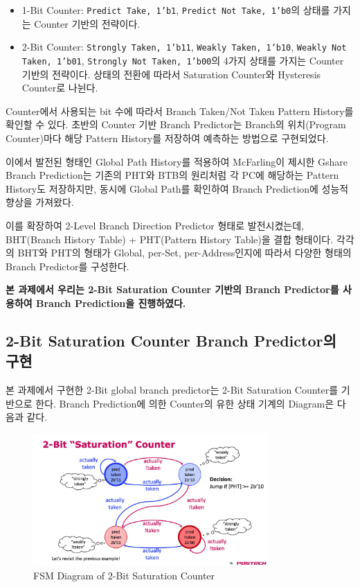 \documentclass[openright, a4paper]{article}
\newcommand{\code}[1]{\texttt{#1}}
\begin{document}
\begin{itemize}
    \item 1-Bit Counter: \code{Predict Take, 1'b1}, \code{Predict Not Take, 1'b0}의 상태를 가지는 Counter 기반의 전략이다.
    \item 2-Bit Counter: \code{Strongly Taken, 1'b11}, \code{Weakly Taken, 1'b10}, \code{Weakly Not Taken, 1'b01}, \code{Strongly Not Taken, 1'b00}의 4가지 상태를 가지는 Counter 기반의 전략이다. 상태의 전환에 따라서 Saturation Counter와 Hysteresis Counter로 나뉜다.
\end{itemize}

Counter에서 사용되는 bit 수에 따라서 Branch Taken/Not Taken Pattern History를 확인할 수 있다. 초반의 Counter 기반 Branch Predictor는 Branch의 위치(Program Counter)마다 해당 Pattern History를 저장하여 예측하는 방법으로 구현되었다.

이에서 발전된 형태인 Global Path History를 적용하여 McFarling이 제시한 Gshare Branch Prediction는 기존의 PHT와 BTB의 원리처럼 각 PC에 해당하는 Pattern History도 저장하지만, 동시에 Global Path를 확인하여 Branch Prediction에 성능적 향상을 가져왔다.

이를 확장하여 2-Level Branch Direction Predictor 형태로 발전시켰는데, BHT(Branch History Table) + PHT(Pattern History Table)을 결합 형태이다. 각각의 BHT와 PHT의 형태가 Global, per-Set, per-Address인지에 따라서 다양한 형태의 Branch Predictor를 구성한다.

\textbf{본 과제에서 우리는 2-Bit Saturation Counter 기반의 Branch Predictor를 사용하여 Branch Prediction을 진행하였다.}

\subsection{2-Bit Saturation Counter Branch Predictor의 구현}

본 과제에서 구현한 2-Bit global branch predictor는 2-Bit Saturation Counter를 기반으로 한다. Branch Prediction에 의한 Counter의 유한 상태 기계의 Diagram은 다음과 같다.

\begin{figure}[h]
    \centering
    \includegraphics[width=0.8\textwidth]{img/2bit_saturation_counter_FSM_diagram.png}
    \caption{FSM Diagram of 2-Bit Saturation Counter}
\end{figure}
\end{document}
